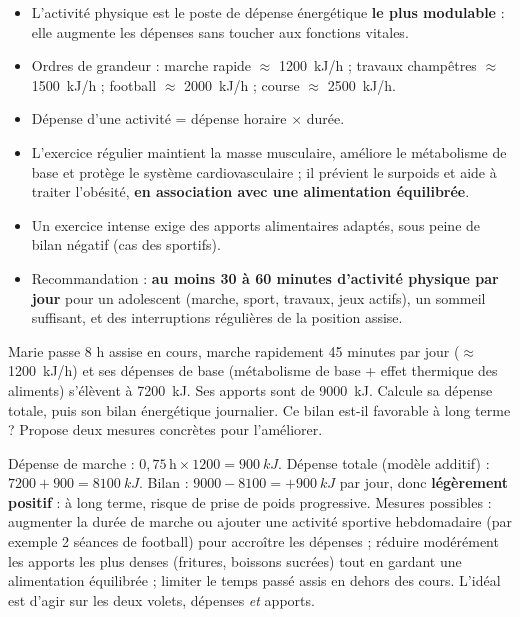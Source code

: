 \documentclass[11pt]{article}
\newcommand{\cle}[1]{{\popxbold\color{popdark}#1}}
\begin{document}
\begin{aretenir}
\begin{itemize}
\item L'\cle{activité physique} est le poste de dépense énergétique \textbf{le plus modulable} : elle augmente les dépenses sans toucher aux fonctions vitales.
\item Ordres de grandeur : marche rapide $\approx$ \SI{1200}{kJ/h} ; travaux champêtres $\approx$ \SI{1500}{kJ/h} ; football $\approx$ \SI{2000}{kJ/h} ; course $\approx$ \SI{2500}{kJ/h}.
\item Dépense d'une activité = dépense horaire $\times$ durée.
\item L'exercice régulier maintient la masse musculaire, améliore le métabolisme de base et protège le système cardiovasculaire ; il prévient le surpoids et aide à traiter l'obésité, \textbf{en association avec une alimentation équilibrée}.
\item Un exercice intense exige des apports alimentaires adaptés, sous peine de bilan négatif (cas des sportifs).
\item Recommandation : \textbf{au moins 30 à 60 minutes d'activité physique par jour} pour un adolescent (marche, sport, travaux, jeux actifs), un sommeil suffisant, et des interruptions régulières de la position assise.
\end{itemize}
\end{aretenir}

\begin{exercice}
Marie passe 8 h assise en cours, marche rapidement 45 minutes par jour ($\approx$ \SI{1200}{kJ/h}) et ses dépenses de base (métabolisme de base + effet thermique des aliments) s'élèvent à \SI{7200}{kJ}. Ses apports sont de \SI{9000}{kJ}. Calcule sa dépense totale, puis son bilan énergétique journalier. Ce bilan est-il favorable à long terme ? Propose deux mesures concrètes pour l'améliorer.
\end{exercice}

\begin{corrige}
Dépense de marche : $0{,}75\,\text{h} \times 1200 = \SI{900}{kJ}$. Dépense totale (modèle additif) : $7200 + 900 = \SI{8100}{kJ}$. Bilan : $9000 - 8100 = +\SI{900}{kJ}$ par jour, donc \textbf{légèrement positif} : à long terme, risque de prise de poids progressive. Mesures possibles : augmenter la durée de marche ou ajouter une activité sportive hebdomadaire (par exemple 2 séances de football) pour accroître les dépenses ; réduire modérément les apports les plus denses (fritures, boissons sucrées) tout en gardant une alimentation équilibrée ; limiter le temps passé assis en dehors des cours. L'idéal est d'agir sur les deux volets, dépenses \emph{et} apports.
\end{corrige}
\end{document}
